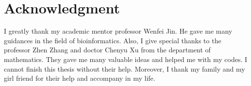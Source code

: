 \section{Acknowledgment}
I greatly thank my academic mentor professor Wenfei Jin. He gave me many guidances in the field of bioinformatics. 
Also, I give special thanks to the professor Zhen Zhang and doctor Chenyu Xu from the department of mathematics. They gave me many valuable ideas and helped me with my codes. I cannot finish this thesis without their help.
Moreover, I thank my family and my girl friend for their help and accompany in my life.
